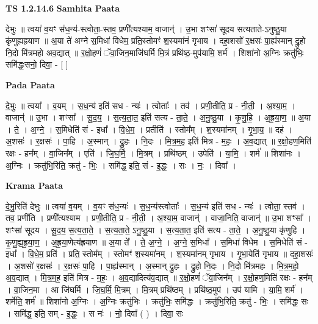 \documentclass[17pt]{extarticle}
\begin{document}
\textbf{TS 1.2.14.6 } \newline
\textbf{Samhita Paata} \newline

देभुः ॥ त्वया॑ व॒यꣳ स॑ध॒न्य॑-स्त्वोता॒-स्तव॒ प्रणी᳚त्यश्याम॒ वाजान्॑ । उ॒भा शꣳसा॑ सूदय सत्यताते-ऽनुष्ठु॒या कृ॑णुह्यह्रयाण ॥ अ॒या ते॑ अग्ने स॒मिधा॑ विधेम॒ प्रति॒स्तोमꣳ॑ श॒स्यमा॑नं गृभाय । दहा॒शसो॑ र॒क्षसः॑ पा॒ह्य॑स्मान् द्रु॒हो नि॒दो मि॑त्रमहो अव॒द्यात् ॥ र॒क्षो॒हणं॑ ॅवा॒जिन॒माजि॑घर्मि मि॒त्रं प्रथि॑ष्ठ॒-मुप॑यामि॒ शर्म॑ । शिशा॑नो अ॒ग्निः क्रतु॑भिः॒ समि॑द्धः॒सनो॒ दिवा॒ - [ ] \newline

\textbf{Pada Paata} \newline

दे॒भुः॒ ॥ त्वया᳚ । व॒यम् । स॒ध॒न्य॑ इति॑ सध - न्यः॑ । त्वोताः᳚ । तव॑ । प्रणी॒तीति॒ प्र - नी॒ती॒ । अ॒श्या॒म॒ । वाजान्॑ ॥ उ॒भा । शꣳसा᳚ । सू॒द॒य॒ । स॒त्य॒ता॒त॒ इति॑ सत्य - ता॒ते॒ । अ॒नु॒ष्ठु॒या । कृ॒णु॒हि॒ । अ॒ह्र॒या॒ण॒ ॥ अ॒या । ते॒ । अ॒ग्ने॒ । स॒मिधेति॑ सं - इधा᳚ । वि॒धे॒म॒ । प्रतीति॑ । स्तोम᳚म् । श॒स्यमा॑नम् । गृ॒भा॒य॒ ॥ दह॑ । अ॒शसः॑ । र॒क्षसः॑ । पा॒हि । अ॒स्मान् । द्रु॒हः । नि॒दः । मि॒त्र॒म॒ह॒ इति॑ मित्र - म॒हः॒ । अ॒व॒द्यात् ॥ र॒क्षो॒हण॒मिति॑ रक्षः - हन᳚म् । वा॒जिन᳚म् । एति॑ । जि॒घ॒र्मि॒ । मि॒त्रम् । प्रथि॑ष्ठम् । उपेति॑ । या॒मि॒ । शर्म॑ ॥ शिशा॑नः । अ॒ग्निः । क्रतु॑भि॒रिति॒ क्रतु॑ - भिः॒ । समि॑द्ध॒ इति॒ सं - इ॒द्धः॒ । सः । नः॒ । दिवा᳚ ।  \newline


\textbf{Krama Paata} \newline

दे॒भु॒रिति॑ देभुः ॥ त्वया॑ व॒यम् । व॒यꣳ स॑ध॒न्यः॑ । स॒ध॒न्य॑स्त्वोताः᳚ । स॒ध॒न्य॑ इति॑ सध - न्यः॑ । त्वोता॒ स्तव॑ । तव॒ प्रणी॑ति । प्रणी᳚त्यश्याम । प्रणी॒तीति॒ प्र - नी॒ती॒ । अ॒श्या॒म॒ वाजान्॑ । वाजा॒निति॒ वाजान्॑ ॥ उ॒भा शꣳसा᳚ । शꣳसा॑ सूदय । सू॒द॒य॒ स॒त्य॒ता॒ते॒ । स॒त्य॒ता॒ते॒ ऽनु॒ष्ठु॒या । स॒त्य॒ता॒त॒ इति॑ सत्य - ता॒ते॒ । अ॒नु॒ष्ठु॒या कृ॑णुहि । कृ॒णु॒ह्य॒ह्र॒या॒ण॒ । अ॒ह्र॒या॒णेत्य॑ह्रयाण ॥ अ॒या ते᳚ । ते॒ अ॒ग्ने॒ । अ॒ग्ने॒ स॒मिधा᳚ । स॒मिधा॑ विधेम । स॒मिधेति॑ सं - इधा᳚ । वि॒धे॒म॒ प्रति॑ । प्रति॒ स्तोम᳚म् । स्तोमꣳ॑ श॒स्यमा॑नम् । श॒स्यमा॑नम् गृभाय । गृ॒भा॒येति॑ गृभाय ॥ दहा॒शसः॑ । अ॒शसो॑ र॒क्षसः॑ । र॒क्षसः॑ पा॒हि । पा॒ह्य॑स्मान् । अ॒स्मान् द्रु॒हः । द्रु॒हो नि॒दः । नि॒दो मि॑त्रमहः । मि॒त्र॒म॒हो॒ अ॒व॒द्यात् । मि॒त्र॒म॒ह॒ इति॑ मित्र - म॒हः॒ । अ॒व॒द्यादित्य॑व॒द्यात् ॥ र॒क्षो॒हणं॑ ॅवा॒जिन᳚म् । र॒क्षो॒हण॒मिति॑ रक्षः - हन᳚म् । वा॒जिन॒मा । आ जि॑घर्मि । जि॒घ॒र्मि॒ मि॒त्रम् । मि॒त्रम् प्रथि॑ष्ठम् । प्रथि॑ष्ठ॒मुप॑ । उप॑ यामि । या॒मि॒ शर्म॑ । शर्मेति॒ शर्म॑ ॥ शिशा॑नो अ॒ग्निः । अ॒ग्निः क्रतु॑भिः । क्रतु॑भिः॒ समि॑द्धः । क्रतु॑भि॒रिति॒ क्रतु॑ - भिः॒ । समि॑द्धः॒ सः । समि॑द्ध॒ इति॒ सम् - इ॒द्धः॒ । स नः॑ । नो॒ दिवा᳚ ( ) । दिवा॒ सः \newline
\end{document}
